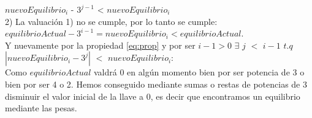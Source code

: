 $nuevoEquilibrio_{i}$ - $3^{j-1}$ < $nuevoEquilibrio_{i}$ \\

2) La valuación 1) no se cumple, por lo tanto se cumple:\\

$equilibrioActual - 3^{i-1} = nuevoEquilibrio_{i} < equilibrioActual$. \\

Y nuevamente por la propiedad \eqref{eq:prop} y por ser $i-1 > 0$ $\exists$ $j$ $<$ $i-1$ $t.q$  $|nuevoEquilibrio_{i} - 3^j|$ $<$ $nuevoEquilibrio_{i}$: \\

Como $equilibrioActual$ valdrá 0 en algún momento bien por ser potencia de 3 o bien por ser 4 o 2.
Hemos conseguido mediante sumas o restas de potencias de 3 disminuir el valor inicial de la llave a  0, es decir que encontramos un equilibrio mediante las pesas.
